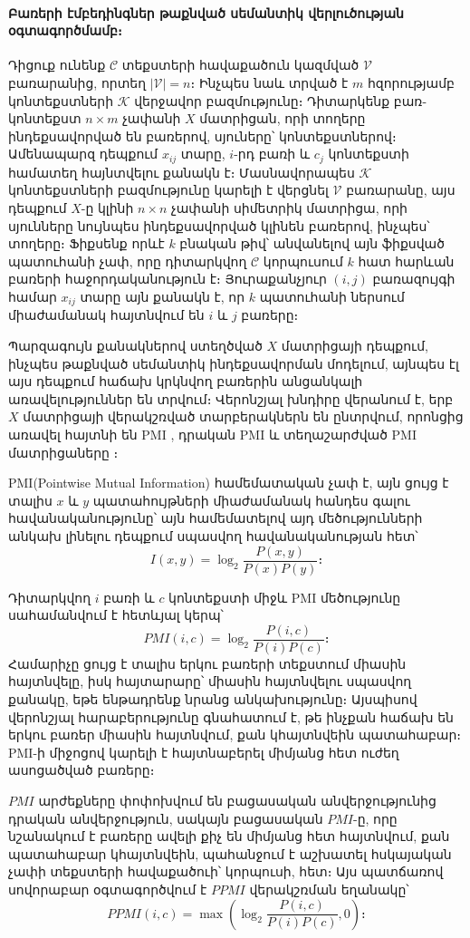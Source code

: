 \documentclass[11pt]{article}
\begin{document}
\paragraph{Բառերի էմբեդինգներ թաքնված սեմանտիկ վերլուծության օգտագործմամբ։} Դիցուք ունենք  $\mathcal{C}$ տեքստերի հավաքածուն կազմված $\mathcal{V}$ բառարանից, որտեղ $|\mathcal{V}| = n$։ Ինչպես նաև տրված է $m$ հզորությամբ կոնտեքստների $\mathcal{K}$ վերջավոր բազմությունը։ Դիտարկենք բառ-կոնտեքստ $n\times m$ չափանի $X$ մատրիցան, որի տողերը ինդեքսավորված են բառերով, սյուները՝ կոնտեքստներով։ Ամենապարզ դեպքում  $x_{ij}$ տարը, $i$-րդ բառի և $c_j$ կոնտեքստի համատեղ հայնտվելու քանակն է։ Մասնավորապես $\mathcal{K}$ կոնտեքստների բազմությունը կարելի է վերցնել $\mathcal{V}$  բառարանը, այս դեպքում $X$-ը կլինի $n\times n$ չափանի սիմետրիկ մատրիցա, որի սյունները նույնպես ինդեքսավորված կլինեն բառերով, ինչպես՝ տողերը։ Ֆիքսենք որևէ $k$ բնական թիվ՝ անվանելով այն ֆիքսված պատուհանի չափ, որը դիտարկվող $\mathcal{C}$ կորպուսում $k$ հատ հարևան բառերի հաջորդականություն է։ Յուրաքանչյուր $(i, j)$ բառազույգի համար $x_{ij}$ տարը այն քանակն է, որ  $k$ պատուհանի ներսում միաժամանակ հայտնվում են $i$ և $j$ բառերը։ 
\par Պարզագույն քանակներով ստեղծված $X$ մատրիցայի դեպքում, ինչպես թաքնված սեմանտիկ ինդեքսավորման մոդելում, այնպես էլ այս դեպքում հաճախ կրկնվող բառերին անցանկալի առավելություններ են տրվում։ Վերոնշյալ խնդիրը վերանում է, երբ $X$ մատրիցայի վերակշռված տարբերակներն են ընտրվում, որոնցից առավել հայտնի են PMI \cite{bib_item_22}, դրական PMI \cite{bib_item_23}  և տեղաշարժված PMI մատրիցաները  \cite{bib_item_23}։ 
\par PMI(Pointwise Mutual Information) համեմատական  չափ է, այն ցույց է տալիս $x$ և $y$ պատահույթների միաժամանակ հանդես գալու հավանականությունը՝ այն համեմատելով այդ մեծությունների  անկախ լինելու դեպքում սպասվող հավանականության հետ՝
$$I(x, y) = \log_2 \frac{P(x, y)}{P(x)P(y)}։$$
\par Դիտարկվող $i$ բառի և $c$ կոնտեքստի միջև PMI մեծությունը սահամանվում է հետևյալ կերպ՝
$$PMI(i, c) =\log_2 \frac{P(i, c)}{P(i)P(c)}։ $$
Համարիչը ցույց է տալիս երկու բառերի տեքստում միասին հայտնվելը, իսկ հայտարարը՝  միասին հայտնվելու սպասվող քանակը, եթե ենթադրենք նրանց անկախությունը։ Այսպիսով վերոնշյալ հարաբերությունը գնահատում է, թե ինչքան հաճախ են երկու բառեր միասին հայտնվում, քան կհայտնվեին պատահաբար։  PMI-ի միջոցով կարելի է հայտնաբերել միմյանց հետ ուժեղ ասոցածված բառերը։
\par $PMI$ արժեքները փոփոխվում են բացասական անվերջությունից դրական անվերջություն, սակայն բացասական $PMI$-ը, որը նշանակում է բառերը ավելի քիչ են միմյանց հետ հայտնվում, քան պատահաբար կհայտնվեին, պահանջում է աշխատել հսկայական չափի տեքստերի հավաքածուի՝ կորպուսի, հետ։ Այս պատճառով սովորաբար օգտագործվում է $PPMI$ վերակշռման եղանակը՝
$$PPMI(i, c) = \max \left(\log_2 \frac{P(i, c)}{P(i)P(c)}, 0 \right)։$$
\end{document}
